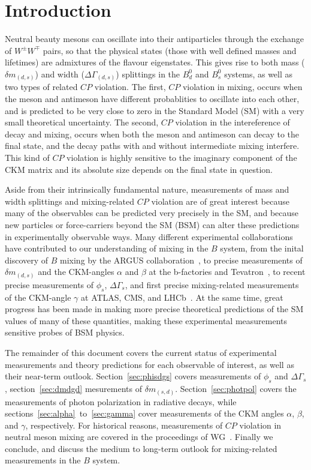 \section{Introduction}
Neutral beauty mesons can oscillate into their antiparticles through the exchange of $W^\pm W^\mp$ pairs, so that the 
physical states (those with well defined masses and lifetimes) are admixtures of the flavour eigenstates. This gives
rise to both mass ($\delta m_{(d,s)}$) and width ($\Delta\Gamma_{(d,s)}$) splittings in the $B^0_d$ and $B^0_s$ systems, as well
as two types of related $CP$ violation. The first, $CP$ violation in mixing, occurs when the meson and antimeson have different
probablities to oscillate into each other, and is predicted to be very close to zero in the Standard Model (SM) with a very
small theoretical uncertainty. The second, $CP$ violation in the intereference of decay and mixing, occurs when both the meson
and antimeson can decay to the final state, and the decay paths with and without intermediate mixing interfere. This kind of $CP$
violation is highly sensitive to the imaginary component of the CKM matrix and its absolute size depends on the final state in question.

Aside from their intrinsically fundamental nature, measurements of mass and width splittings and mixing-related $CP$ violation are
of great interest because many of the observables can be predicted very precisely in the SM, and because new particles or force-carriers
beyond the SM (BSM) can alter these predictions in experimentally observable ways. Many different experimental collaborations have contributed
to our understanding of mixing in the $B$ system, from the inital discovery of $B$ mixing by the ARGUS collaboration~\cite{}, to precise measurements
of $\delta m_{(d,s)}$ and the CKM-angles $\alpha$ and $\beta$ at the b-factories and Tevatron~\cite{}, to recent precise measurements
of $\phi_s$, $\Delta\Gamma_s$, and first precise mixing-related measurements of the CKM-angle $\gamma$ at ATLAS, CMS, and LHCb~\cite{}. At the same
time, great progress has been made in making more precise theoretical predictions of the SM values of many of these quantities, making
these experimental measurements sensitive probes of BSM physics.

The remainder of this document covers the current status of experimental measurements and theory predictions for each observable of
interest, as well as their near-term outlook. Section~\ref{sec:phisdgs} covers measurements of $\phi_s$ and $\Delta\Gamma_s$, section~\ref{sec:dmdgd} 
mesurements of $\delta m_{(s,d)}$. Section~\ref{sec:photpol} covers the measurements of photon polarization in radiative decays, while
sections~\ref{sec:alpha}~to~\ref{sec:gamma} cover measurements of the CKM angles $\alpha$, $\beta$, and $\gamma$, respectively.
For historical reasons, measurements of $CP$ violation in neutral meson mixing are covered in the proceedings of WG~\cite{}. Finally we conclude,
and discuss the medium to long-term outlook for mixing-related measurements in the $B$ system.


